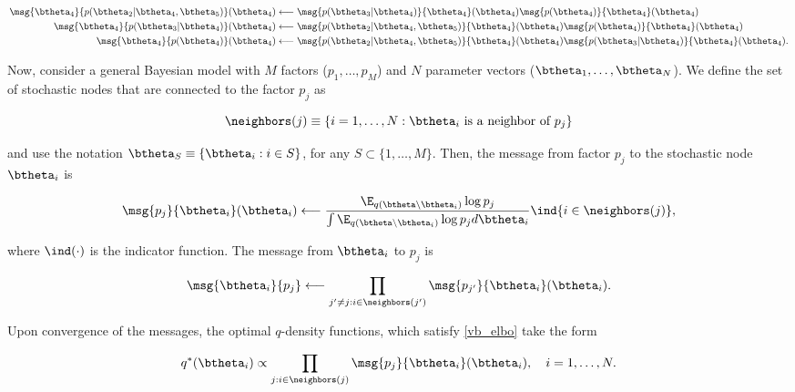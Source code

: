 \documentclass[12pt]{article}
\theoremstyle{plain}
\theoremstyle{definition}
\theoremstyle{remark}
\begin{document}
\begin{align*}
	\msg{\btheta_4}{p (\btheta_2 | \btheta_4, \btheta_5)} (\btheta_4)
		&\longleftarrow
			\msg{p (\btheta_3 | \btheta_4)}{\btheta_4} (\btheta_4) \msg{p(\btheta_4)}{\btheta_4} (\btheta_4) \\
	\msg{\btheta_4}{p (\btheta_3 | \btheta_4)} (\btheta_4)
		&\longleftarrow
			\msg{p (\btheta_2 | \btheta_4, \btheta_5)}{\btheta_4} (\btheta_4)
			\msg{p (\btheta_4)}{\btheta_4} (\btheta_4) \\
	\msg{\btheta_4}{p (\btheta_4)} (\btheta_4)
		&\longleftarrow
			\msg{p (\btheta_2 | \btheta_4, \btheta_5)}{\btheta_4} (\btheta_4)
			\msg{p (\btheta_3 | \btheta_4)}{\btheta_4} (\btheta_4).
\end{align*}

Now, consider a general Bayesian model with $M$ factors ($p_1, \dots, p_M$) and $N$ parameter vectors
($\btheta_1, \dots, \btheta_N$). We define the set of stochastic nodes that are connected to the factor
$p_j$ as

\[
	\neighbors (j) \equiv \{ i = 1, \dots, N: \text{$\btheta_i$ is a neighbor of $p_j$} \}
\]

\noindent and use the notation
$\btheta_S \equiv \{ \btheta_i : i \in S \}$, for any $S \subset \{ 1, \dots, M \}$. Then, the message from factor
$p_j$ to the stochastic node $\btheta_i$ is

\begin{equation}
	\msg{p_j}{\btheta_i} (\btheta_i)
		\longleftarrow
			\frac{
				\E_{q(\btheta \setminus \btheta_i)} \log p_j
			} {
				\int \E_{q(\btheta \setminus \btheta_i)} \log p_j d\btheta_i
			} \ind \{ i \in \neighbors(j) \},
\label{msg_fact_sn}
\end{equation}

\noindent where $\ind (\cdot)$ is the indicator function. The message from $\btheta_i$ to $p_j$ is

\begin{equation}
	\msg{\btheta_i}{p_j}
		\longleftarrow
			\prod_{j' \neq j : i \in \neighbors(j')} \msg{p_{j'}}{\btheta_i} (\btheta_i).
\label{msg_sn_fact}
\end{equation}

\noindent Upon convergence of the messages, the optimal $q$-density functions, which satisfy \eqref{vb_elbo}
take the form

\begin{equation}
	q^* (\btheta_i) \propto \prod_{j : i \in \neighbors(j)} \msg{p_j}{\btheta_i} (\btheta_i), \quad i = 1, \dots, N.
\label{opt_q_vmp}
\end{equation}
\end{document}
